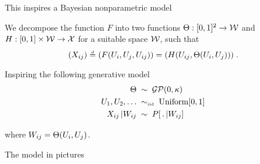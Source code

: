 \begin{frame}{This inspires a Bayesian nonparametric model}
\begin{block}{}
We decompose the function $F$ into two functions 
${\Theta:[0,1]^2\rightarrow\mathcal{W}}$ 
and ${H:[0,1]\times\mathcal{W}\rightarrow\mathcal{X}}$ for a suitable space $\mathcal{W}$\/, such that
\begin{equation*}
  \label{eq:decomposition}
  (X_{ij}) \overset{\,_{\!d}}{=} (F(U_i,U_j,U_{ij}))=(H(U_{ij},\Theta(U_i,U_j)))\;.
\end{equation*}
\end{block}
\begin{block}{}
Inspiring the following generative model
\begin{equation}
  \begin{split}
    \Theta\; &\sim\; \mathcal{GP}(0,\kappa) \\
    U_{1},U_{2},\ldots\; &\sim_{\mbox{\tiny iid}}\; \mbox{\rm Uniform}[0,1] \nonumber \\
    X_{ij}\,|W_{ij}\; &\sim\; P[\,.\,|W_{ij}]
  \end{split}
\end{equation}

\begin{center}
where $W_{ij}=\Theta(U_i,U_j)$.
\end{center}
\end{block}
\end{frame}

\begin{frame}{The model  in pictures}
 \begin{block}{}
   
 \end{block}
\end{frame}

